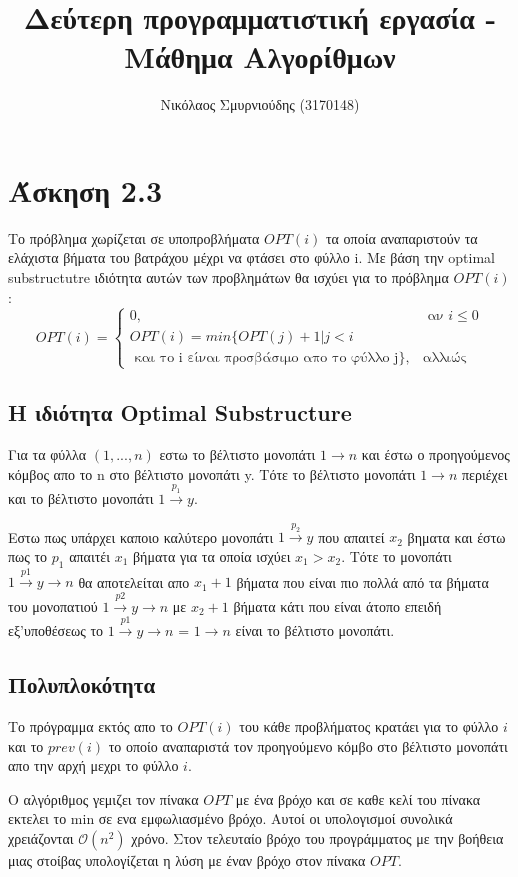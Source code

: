\documentclass{article}
\renewcommand{\O}{\mathcal{O}}
\begin{document}
\author{Νικόλαος Σμυρνιούδης (3170148)}
\title{Δεύτερη προγραμματιστική εργασία - Μάθημα Αλγορίθμων}
\maketitle
\section{Άσκηση 2.3}
Το πρόβλημα χωρίζεται σε υποπροβλήματα $OPT(i)$ τα οποία αναπαριστούν
τα ελάχιστα βήματα του βατράχου μέχρι να φτάσει στο φύλλο i. Με βάση
την optimal substructutre ιδιότητα αυτών των προβλημάτων θα ισχύει για
το πρόβλημα $OPT(i)$:
\[
OPT(i) = \left\{
\begin{array}{ll}
	 0, & \text{ αν } i \leq 0  \\
	 OPT(i) = min\{OPT(j) + 1| j < i \\ \text{ και το i είναι προσβάσιμο απο το φύλλο j}
	 \}, & \text{αλλιώς} 
	
\end{array}	
\right.
\]
\subsection{Η ιδιότητα Optimal Substructure}
Για τα φύλλα $(1,...,n)$ εστω το βέλτιστο μονοπάτι  $1 \to n$ και έστω ο προηγούμενος κόμβος
απο το n στο βέλτιστο μονοπάτι y. Τότε το βέλτιστο μονοπάτι $1 \xrightarrow{}  n$ περιέχει και το βέλτιστο
μονοπάτι $1 \xrightarrow{p_1} y$.

Εστω πως υπάρχει καποιο καλύτερο μονοπάτι $1 \xrightarrow{p_2} y$ που απαιτεί $x_2$ βηματα και έστω πως το
$p_1$ απαιτέι $x_1$ βήματα για τα οποία ισχύει $x_1 > x_2 $. Τότε το μονοπάτι $1\xrightarrow{p1}y\xrightarrow{}n$ θα αποτελείται απο
$x_1+1$ βήματα που είναι πιο πολλά από τα βήματα του μονοπατιού $1\xrightarrow{p2}y\xrightarrow{}n$ με $x_2+1$ βήματα κάτι που είναι άτοπο
επειδή εξ'υποθέσεως το   $1\xrightarrow{p1}y\xrightarrow{}n$ = $1\xrightarrow{}n$ είναι το βέλτιστο μονοπάτι.
\subsection{Πολυπλοκότητα}
Το πρόγραμμα εκτός απο το $OPT(i)$ του κάθε προβλήματος κρατάει για
το φύλλο $i$ και το $prev(i)$ το οποίο αναπαριστά τον προηγούμενο κόμβο
στο βέλτιστο μονοπάτι απο την αρχή μεχρι το φύλλο $i$.

Ο αλγόριθμος γεμιζει τον πίνακα $OPT$ με ένα βρόχο και σε καθε κελί
του πίνακα εκτελει το min σε ενα εμφωλιασμένο βρόχο. Αυτοί οι
υπολογισμοί συνολικά χρειάζονται $ \O(n^2)$ χρόνο. Στον τελευταίο βρόχο
του προγράμματος με την βοήθεια μιας στοίβας υπολογίζεται η λύση με έναν
βρόχο στον πίνακα $OPT$. 
\end{document}

